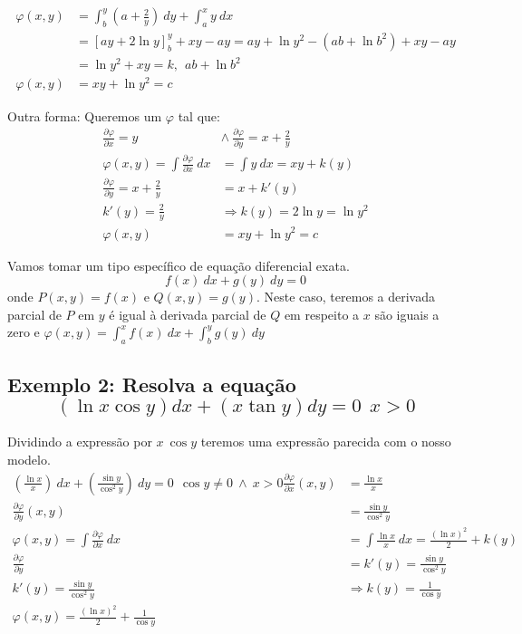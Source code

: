\documentclass[12pt,openany, letterpaper]{book}
\begin{document}
{{\begin{align*}
    \varphi(x,y) &= \int_b^y \left(a+ \frac{2}{y}\right) \ dy + \int_a^x y \ dx \\
    &= [ay + 2 \ln y]_b^y + xy - ay = ay + \ln y^2 - (ab + \ln b^2) + xy -ay \\
    &= \ln y^2 + xy = k, \ \ ab + \ln b^2 \\
    \varphi (x,y) &= xy +\ln y^2 = c
\end{align*}

Outra forma: Queremos um $\varphi$ tal que:
\begin{align*}
    \frac{\partial \varphi}{\partial x} = y \ &\land \ \frac{\partial \varphi}{\partial y} = x + \frac{2}{y} \\
    \varphi(x,y) = \int \frac{\partial \varphi}{\partial x} \ dx &= \int y \ dx = xy + k(y) \\
    \frac{\partial \varphi}{\partial y} = x + \frac{2}{y} &= x + k'(y) \\
    k'(y) = \frac{2}{y} &\Rightarrow k(y) = 2 \ln y = \ln y^2 \\
    \varphi(x,y) &= xy + \ln y^2 = c
\end{align*}

Vamos tomar um tipo específico de equação diferencial exata. $$f(x) \ dx + g(y) \ dy = 0$$ onde $P(x,y) = f(x)$ e $Q(x,y) = g(y)$. Neste caso, teremos a derivada parcial de $P$ em $y$ é igual à derivada parcial de $Q$ em respeito a $x$ são iguais a zero e $\varphi(x,y) = \int_a^x f(x) \ dx + \int_b^y g(y) \ dy$

\subsection*{Exemplo 2: Resolva a equação $$(\ln x \cos y)dx + (x \tan y)dy = 0 \ \ x > 0 $$}

\hspace{5mm} Dividindo a expressão por $x \ \cos y$ teremos uma expressão parecida com o nosso modelo. \begin{align*}
    \left( \frac{\ln x}{x}\right) \ dx + \left( \frac{\sin y}{\cos^2 y}\right)\ dy = 0 \ \ \cos y \neq 0 \ \land \ x >0 
    \frac{\partial \varphi}{\partial x}(x,y) &= \frac{\ln x}{x}\\
    \frac{\partial \varphi}{\partial y}(x,y) &= \frac{\sin y}{\cos^2 y} \\
    \varphi(x,y) = \int \frac{\partial \varphi}{\partial x}\ dx &= \int \frac{\ln x}{x}\ dx = \frac{(\ln x)^2}{2} + k(y) \\
    \frac{\partial \varphi}{\partial y} &= k'(y) = \frac{\sin y}{\cos^2 y}\\
    k'(y) = \frac{\sin y}{\cos^2 y} &\Rightarrow k(y) = \frac{1}{\cos y} \\
    \varphi(x,y) = \frac{(\ln x)^2}{2}+ \frac{1}{\cos y}
\end{align*}

}}
\end{document}

